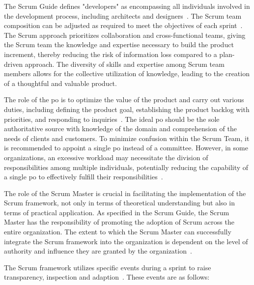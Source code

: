 \begin{description}[style=nextline]
    \item[Developers]
    The Scrum Guide defines "\glspl{developer}" as encompassing all individuals involved in the development process, including architects and designers~\cite[p.~1]{Schwaber2020Tsg}. The Scrum team composition can be adjusted as required to meet the objectives of each sprint~\cite[p.~203]{Rubin2012ESA}. The Scrum approach prioritizes collaboration and cross-functional teams, giving the Scrum team the knowledge and expertise necessary to build the product increment, thereby reducing the risk of information loss compared to a \gls{plan-driven} approach. The diversity of skills and expertise among Scrum team members allows for the collective utilization of knowledge, leading to the creation of a thoughtful and valuable product.
    \item[Product Owner]
    The role of the \ac{po} is to optimize the value of the product and carry out various duties, including defining the product goal, establishing the product backlog with priorities, and responding to inquiries~\cite[pp.~5--6]{Schwaber2020Tsg}. The ideal \ac{po} should be the sole authoritative source with knowledge of the domain and comprehension of the needs of \glspl{client} and \glspl{customer}. To minimize confusion within the Scrum Team, it is recommended to appoint a single \ac{po} instead of a committee. However, in some organizations, an excessive workload may necessitate the division of responsibilities among multiple individuals, potentially reducing the capability of a single \ac{po} to effectively fulfill their responsibilities~\cite[p.~182]{Rubin2012ESA}.
    \item[Scrum Master]
    The role of the Scrum Master is crucial in facilitating the implementation of the Scrum \gls{framework}, not only in terms of theoretical understanding but also in terms of practical application. As specified in the Scrum Guide, the Scrum Master has the responsibility of promoting the \gls{adoption} of Scrum across the entire organization. The extent to which the Scrum Master can successfully integrate the Scrum \gls{framework} into the organization is dependent on the level of authority and influence they are granted by the organization~\cite[p.~6]{Schwaber2020Tsg}.
\end{description}

The Scrum \gls{framework} utilizes specific events during a sprint to raise transparency, inspection and adaption~\cite[p.~3]{Schwaber2020Tsg}. These events are as follows:

